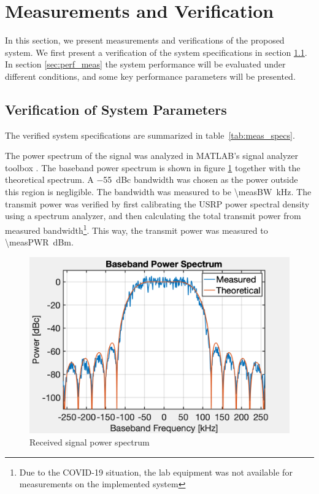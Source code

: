 \section{Measurements and Verification}
\label{sec:verification}
In this section, we present measurements and verifications of the proposed system. We first present a verification of the system specifications in section \ref{sec:specs_verification}. In section \ref{sec:perf_meas} the system performance will be evaluated under different conditions, and some key performance parameters will be presented.

\subsection{Verification of System Parameters}
\label{sec:specs_verification}
The verified system specifications are summarized in table~\ref{tab:meas_specs}.


The power spectrum of the signal was analyzed in MATLAB's signal analyzer toolbox \cite{signalAnalyzer}. The baseband power spectrum is shown in figure \ref{fig:pwr_spectrum} together with the theoretical spectrum. A \SI{-55}{dBc} bandwidth was chosen as the power outside this region is negligible. The bandwidth was measured to be \SI{\measBW}{kHz}.
The transmit power was verified by first calibrating the USRP power spectral density using a spectrum analyzer, and then calculating the total transmit power from measured bandwidth\footnote{Due to the COVID-19 situation, the lab equipment was not available for measurements on the implemented system}. This way, the transmit power was measured to \SI{\measPWR}{dBm}.

\begin{figure}[htbp]
\begin{center}
\includegraphics[width=\figW\linewidth]{spectrum.png}
\caption{Received signal power spectrum}
\label{fig:pwr_spectrum}
\end{center}
\end{figure}

